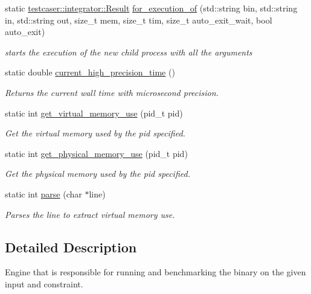 \begin{DoxyCompactItemize}
\item 
static \hyperlink{classtestcaser_1_1integrator_1_1Result}{testcaser\+::integrator\+::\+Result} \hyperlink{structtestcaser_1_1internal_1_1executor__engine_a51f467bc2013c188b5e4454fa919ea70}{for\+\_\+execution\+\_\+of} (std\+::string bin, std\+::string in, std\+::string out, size\+\_\+t mem, size\+\_\+t tim, size\+\_\+t auto\+\_\+exit\+\_\+wait, bool auto\+\_\+exit)
\begin{DoxyCompactList}\small\item\em starts the execution of the new child process with all the arguments \end{DoxyCompactList}\item 
static double \hyperlink{structtestcaser_1_1internal_1_1executor__engine_af3546e4b21e46fc05bb38f014a88ed6f}{current\+\_\+high\+\_\+precision\+\_\+time} ()
\begin{DoxyCompactList}\small\item\em Returns the current wall time with microsecond precision. \end{DoxyCompactList}\item 
static int \hyperlink{structtestcaser_1_1internal_1_1executor__engine_ab70c6b9356bc0dbaf138aa017b048e8a}{get\+\_\+virtual\+\_\+memory\+\_\+use} (pid\+\_\+t pid)
\begin{DoxyCompactList}\small\item\em Get the virtual memory used by the pid specified. \end{DoxyCompactList}\item 
static int \hyperlink{structtestcaser_1_1internal_1_1executor__engine_a7162cc64fce4440e029086bf4f1efc7f}{get\+\_\+physical\+\_\+memory\+\_\+use} (pid\+\_\+t pid)
\begin{DoxyCompactList}\small\item\em Get the physical memory used by the pid specified. \end{DoxyCompactList}\item 
static int \hyperlink{structtestcaser_1_1internal_1_1executor__engine_a80ed3584cab00a573de09502df329919}{parse} (char $\ast$line)
\begin{DoxyCompactList}\small\item\em Parses the line to extract virtual memory use. \end{DoxyCompactList}\end{DoxyCompactItemize}


\subsection{Detailed Description}
Engine that is responsible for running and benchmarking the binary on the given input and constraint. 

